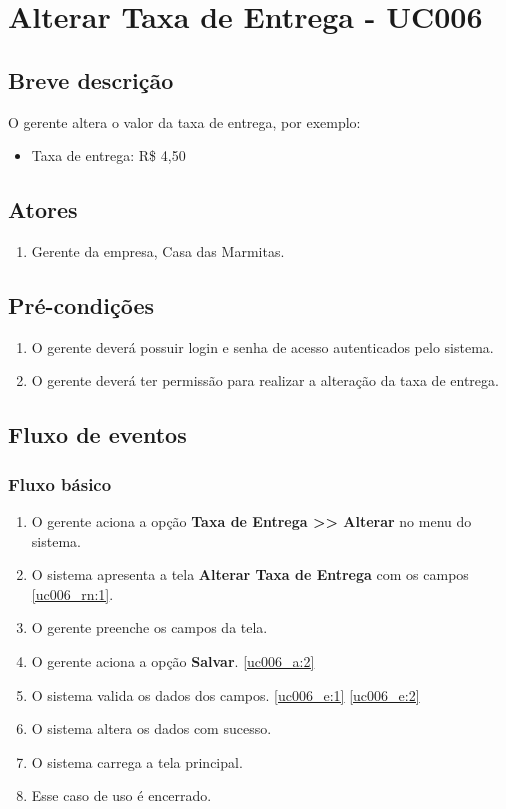 \chapter{Alterar Taxa de Entrega - UC006} \label{uc006}

\section{Breve descrição}

O gerente altera o valor da taxa de entrega, por exemplo:

\begin{itemize}
	\item Taxa de entrega: R\$ 4,50
\end{itemize}

\section{Atores}

\begin{enumerate}
	\item Gerente da empresa, Casa das Marmitas.
\end{enumerate}

\section{Pré-condições}

\begin{enumerate}
	\item O gerente deverá possuir login e senha de acesso autenticados pelo sistema.
	\item O gerente deverá ter permissão para realizar a alteração da taxa de entrega.
\end{enumerate}

\section{Fluxo de eventos}

\subsection{Fluxo básico}

\begin{enumerate}[label=P\arabic*]
	\item O gerente aciona a opção \textbf{Taxa de Entrega >> Alterar} no menu do sistema.
	\item O sistema apresenta a tela \textbf{Alterar Taxa de Entrega} com os campos \ref{uc006_rn:1}. \label{uc006_p:2}
	\item O gerente preenche os campos da tela. \label{uc006_p:3}
	\item O gerente aciona a opção \textbf{Salvar}. \label{uc006_p:4}\ref{uc006_a:2}
	\item O sistema valida os dados dos campos. \ref{uc006_e:1} \ref{uc006_e:2}
	\item O sistema altera os dados com sucesso.
	\item O sistema carrega a tela principal.
	\item Esse caso de uso é encerrado.	
\end{enumerate}

